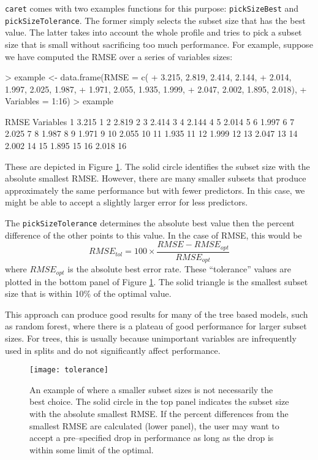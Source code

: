 \documentclass[12pt]{article}
\begin{document}
\texttt{caret} comes with two examples functions for this purpose: \texttt{pickSizeBest} and \texttt{pickSizeTolerance}. The former simply selects the subset size that has the best value. The latter takes into account the whole profile and tries to pick a subset size that is small without sacrificing too much performance. For example, suppose we have computed the RMSE over a series of variables sizes:
\begin{Schunk}
\begin{Sinput}
>   example <- data.frame(RMSE = c(
+                           3.215, 2.819, 2.414, 2.144, 
+                           2.014, 1.997, 2.025, 1.987, 
+                           1.971, 2.055, 1.935, 1.999, 
+                           2.047, 2.002, 1.895, 2.018),
+                         Variables = 1:16)
> example
\end{Sinput}
\begin{Soutput}
    RMSE Variables
1  3.215         1
2  2.819         2
3  2.414         3
4  2.144         4
5  2.014         5
6  1.997         6
7  2.025         7
8  1.987         8
9  1.971         9
10 2.055        10
11 1.935        11
12 1.999        12
13 2.047        13
14 2.002        14
15 1.895        15
16 2.018        16
\end{Soutput}
\end{Schunk}
These are depicted in Figure \ref{F:tolerance}. The solid circle identifies the subset size with the absolute smallest RMSE. However, there are many smaller subsets that produce approximately the same performance but with fewer predictors. In this case, we might be able to accept a slightly larger error for less predictors.

The \texttt{pickSizeTolerance} determines the absolute best value then the percent difference of the other points to this value. In the case of RMSE, this would be
\[
RMSE_{tol} = 100\times \frac{RMSE - RMSE_{opt}}{RMSE_{opt}}
\]
where $RMSE_{opt}$ is the absolute best error rate. These ``tolerance'' values are plotted in the bottom panel of Figure  \ref{F:tolerance}. The solid triangle is the smallest subset size that is within 10$\%$ of the optimal value.

This approach can produce good results for many of the tree based models, such as random forest, where there is a plateau of good performance for larger subset sizes. For trees, this is usually because unimportant variables are infrequently used in splits and do not significantly affect performance.


\begin{figure}
   \begin{center}
      \texttt{[image: tolerance]}
      \caption{An example of where a smaller subset sizes is not necessarily the best choice. The solid circle in the top panel indicates the subset size with the absolute smallest RMSE. If the percent differences from the smallest RMSE  are calculated (lower panel), the user may want to accept a pre--specified drop in performance as long as the drop is within some limit of the optimal.}         
      \label{F:tolerance} 
    \end{center}
\end{figure}
\end{document}
